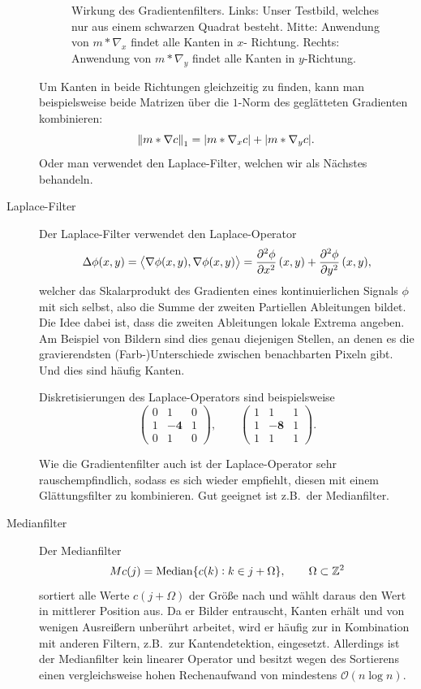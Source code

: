\begin{example}
\begin{description}
\begin{figure}[ht]
\begin{minipage}{0.3\textwidth}
    \end{minipage}
  \caption{Wirkung des Gradientenfilters. Links: Unser Testbild, welches nur aus einem schwarzen 
    Quadrat besteht. Mitte: Anwendung von $ m * \nabla_{x} $ findet alle Kanten in $ x $-
    Richtung. Rechts: Anwendung von $ m * \nabla_{y} $ findet alle Kanten in $ y $-Richtung.}
  \label{fig:Gradient}
  \end{figure}
  Um Kanten in beide Richtungen gleichzeitig zu finden, kann man beispielsweise beide Matrizen über 
  die $ 1 $-Norm des geglätteten Gradienten kombinieren:
  \[
    \norm{m * \nabla c}_{1} = |m * \nabla_{x} c| + |m * \nabla_{y} c|.
  \]
  Oder man verwendet den Laplace-Filter, welchen wir als Nächstes behandeln.
\item [Laplace-Filter] Der Laplace-Filter verwendet den Laplace-Operator
  \[
      \Delta \phi(x,y) 
    = \left\langle \nabla \phi(x,y), \nabla \phi(x,y) \right\rangle
    = \dpd[2]{\phi}{x}(x,y) + \dpd[2]{\phi}{y}(x,y),
  \]
  welcher das Skalarprodukt des Gradienten eines kontinuierlichen Signals $ \phi $ mit sich selbst, 
  also die Summe der zweiten Partiellen Ableitungen bildet. Die Idee dabei ist, dass die zweiten
  Ableitungen lokale Extrema angeben. Am Beispiel von Bildern sind dies genau diejenigen Stellen,
  an denen es die gravierendsten (Farb-)Unterschiede zwischen benachbarten Pixeln gibt. Und dies
  sind häufig Kanten.
  
  Diskretisierungen des Laplace-Operators sind beispielsweise
  \[
    \begin{pmatrix}
      0 & 1 & 0 \\
      1 & \mathbf{-4} & 1 \\
      0 & 1 & 0
    \end{pmatrix}, \qquad
    \begin{pmatrix}
      1 & 1 & 1 \\
      1 & \mathbf{-8} & 1 \\
      1 & 1 & 1
    \end{pmatrix}.
  \]
  
  Wie die Gradientenfilter auch ist der Laplace-Operator sehr rauschempfindlich, sodass es sich
  wieder empfiehlt, diesen mit einem Glättungsfilter zu kombinieren. Gut geeignet ist z.B.\ der
  Medianfilter.
\item [Medianfilter] Der Medianfilter
  \[
    Mc(j) = \operatorname{Median}\{ c(k) : k \in j + \Omega \}, \qquad \Omega \subset \mathbb{Z}^{2}
  \]
  sortiert alle Werte $ c(j + \Omega) $ der Größe nach und wählt daraus den Wert in mittlerer
  Position aus. Da er Bilder entrauscht, Kanten erhält und von wenigen Ausreißern unberührt
  arbeitet, wird er häufig zur in Kombination mit anderen Filtern, z.B.\ zur Kantendetektion, 
  eingesetzt. Allerdings ist der Medianfilter kein linearer Operator und besitzt wegen des 
  Sortierens einen vergleichsweise hohen Rechenaufwand von mindestens $ \mathcal{O}(n \log n) $.
\end{description}
\end{example}